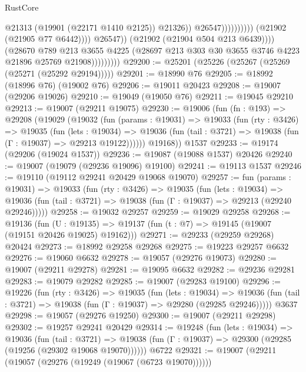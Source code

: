 \begin{lexlean}{RustCore}
\begin{coremodule}
                                                      @21313
                                                      (@19901 (@22171 @1410 @2125))
                                                      @21326))
                                                  @26547))))))))))
                              (@21902 (@21905 @77 @6442))))
                          @26547))
                      (@21902 (@21904 @504 @213 @6439))))
                  (@28670
                    @789
                    @213
                    @3655
                    @4225
                    (@28697 @213 @303 @30 @3655 @3746 @4223 @21896 @25769 @21908)))))))))
@29200 := @25201 (@25226 (@25267 (@25269 (@25271 (@25292 @29194)))))
@29201 := @18990 @76
@29205 := @18992 (@18996 @76) (@19002 @76)
@29206 := @19011 @20423
@29208 := @19007 (@29206 @19026)
@29210 := @19049 (@19050 @76)
@29211 := @19045 @29210
@29213 := @19007 (@29211 @19075)
@29230 := @19006
    (fun (fn : @193) =>
    @29208
      (@19029
        (@19032
          (fun (params : @19031) =>
          @19033
            (fun (rty : @3426) =>
            @19035
              (fun (lets : @19034) =>
              @19036 (fun (tail : @3721) => @19038 (fun (Γ : @19037) => @29213 @19122))))))
        @19168))
    @1537
@29233 := @19174 (@29206 (@19024 @1537))
@29236 := @19087 (@19088 @1537) @20426
@29240 := @19007 (@19079 (@29236 @19096) @19100)
@29241 := @19113 @1537
@29246 := @19110 (@19112 @29241 @20429 @19068 @19070)
@29257 := fun (params : @19031) =>
  @19033
    (fun (rty : @3426) =>
    @19035
      (fun (lets : @19034) =>
      @19036 (fun (tail : @3721) => @19038 (fun (Γ : @19037) => @29213 (@29240 @29246)))))
@29258 := @19032 @29257
@29259 := @19029 @29258
@29268 := @19136
    (fun (U : @19135) => @19137 (fun (t : @7) => @19145 (@19007 (@19151 @20426 @19025) @19162)))
@29271 := @29233 (@29259 @29268) @20424
@29273 := @18992 @29258 @29268
@29275 := @19223 @29257 @6632
@29276 := @19060 @6632
@29278 := @19057 (@29276 @19073)
@29280 := @19007 (@29211 @29278)
@29281 := @19095 @6632
@29282 := @29236 @29281
@29283 := @19079 @29282
@29285 := @19007 (@29283 @19100)
@29296 := @19226
    (fun (rty : @3426) =>
    @19035
      (fun (lets : @19034) =>
      @19036 (fun (tail : @3721) => @19038 (fun (Γ : @19037) => @29280 (@29285 @29246)))))
    @3637
@29298 := @19057 (@29276 @19250)
@29300 := @19007 (@29211 @29298)
@29302 := @19257 @29241 @20429
@29314 := @19248
    (fun (lets : @19034) =>
    @19036
      (fun (tail : @3721) =>
      @19038 (fun (Γ : @19037) => @29300 (@29285 (@19256 (@29302 @19068 @19070))))))
    @6722
@29321 := @19007 (@29211 (@19057 (@29276 (@19249 (@19067 (@6723 @19070))))))

\end{coremodule}
\end{lexlean}
